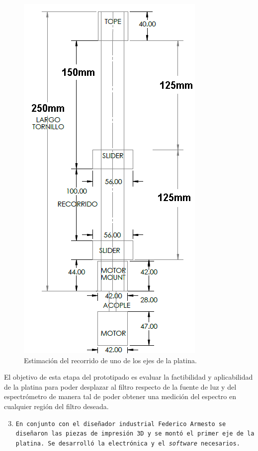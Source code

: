 \begin{figure}[H]
	\centering
	\includegraphics[scale=1.0]{Figs/microespectrometro/dimensio.png}
	\caption{Estimación del recorrido de uno de los ejes de la platina.}
	\label{fig:dimejee}
\end{figure}

El objetivo de esta etapa del prototipado es evaluar la factibilidad y aplicabilidad de la platina para poder desplazar al filtro respecto de la fuente de luz y del espectrómetro de manera tal de poder obtener una medición del espectro en cualquier región del filtro deseada. 

\begin{enumerate}
  \setcounter{enumi}{2}
  \item \texttt{En conjunto con el diseñador industrial Federico Armesto se diseñaron las piezas de impresión 3D y se montó el primer eje de la platina. Se desarrolló la electrónica y el \textit{software} necesarios.}
\end{enumerate}





